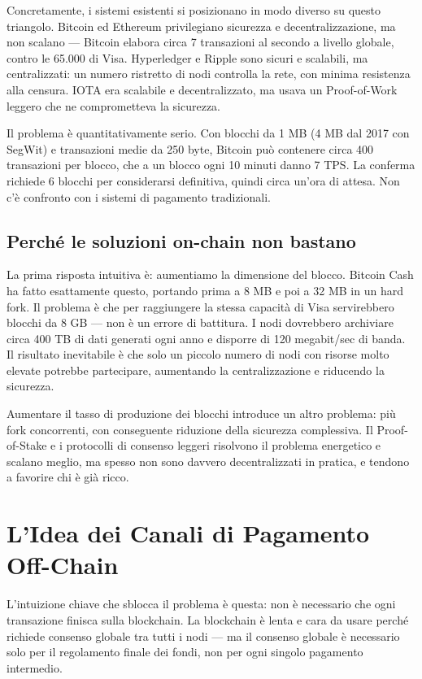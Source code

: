 \documentclass[
  italian,
  openany]{book}
\begin{document}
Concretamente, i sistemi esistenti si posizionano in modo diverso su
questo triangolo. Bitcoin ed Ethereum privilegiano sicurezza e
decentralizzazione, ma non scalano --- Bitcoin elabora circa 7
transazioni al secondo a livello globale, contro le 65.000 di Visa.
Hyperledger e Ripple sono sicuri e scalabili, ma centralizzati: un
numero ristretto di nodi controlla la rete, con minima resistenza alla
censura. IOTA era scalabile e decentralizzato, ma usava un Proof-of-Work
leggero che ne comprometteva la sicurezza.

Il problema è quantitativamente serio. Con blocchi da 1 MB (4 MB dal
2017 con SegWit) e transazioni medie da 250 byte, Bitcoin può contenere
circa 400 transazioni per blocco, che a un blocco ogni 10 minuti danno 7
TPS. La conferma richiede 6 blocchi per considerarsi definitiva, quindi
circa un'ora di attesa. Non c'è confronto con i sistemi di pagamento
tradizionali.

\subsection{Perché le soluzioni on-chain non
bastano}\label{perchuxe9-le-soluzioni-on-chain-non-bastano}

La prima risposta intuitiva è: aumentiamo la dimensione del blocco.
Bitcoin Cash ha fatto esattamente questo, portando prima a 8 MB e poi a
32 MB in un hard fork. Il problema è che per raggiungere la stessa
capacità di Visa servirebbero blocchi da 8 GB --- non è un errore di
battitura. I nodi dovrebbero archiviare circa 400 TB di dati generati
ogni anno e disporre di 120 megabit/sec di banda. Il risultato
inevitabile è che solo un piccolo numero di nodi con risorse molto
elevate potrebbe partecipare, aumentando la centralizzazione e riducendo
la sicurezza.

Aumentare il tasso di produzione dei blocchi introduce un altro
problema: più fork concorrenti, con conseguente riduzione della
sicurezza complessiva. Il Proof-of-Stake e i protocolli di consenso
leggeri risolvono il problema energetico e scalano meglio, ma spesso non
sono davvero decentralizzati in pratica, e tendono a favorire chi è già
ricco.

\section{L'Idea dei Canali di Pagamento
Off-Chain}\label{lidea-dei-canali-di-pagamento-off-chain}

L'intuizione chiave che sblocca il problema è questa: non è necessario
che ogni transazione finisca sulla blockchain. La blockchain è lenta e
cara da usare perché richiede consenso globale tra tutti i nodi --- ma
il consenso globale è necessario solo per il regolamento finale dei
fondi, non per ogni singolo pagamento intermedio.
\end{document}
